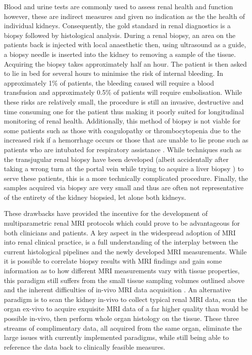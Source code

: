 Blood and urine tests are commonly used to assess renal health and function however, these are indirect measures and given no indication as the the health of individual kidneys. Consequently, the gold standard in renal diagnostics is a biopsy followed by histological analysis. During a renal biopsy, an area on the patients back is injected with local anaesthetic then, using ultrasound as a guide, a biopsy needle is inserted into the kidney to removing a sample of the tissue. Acquiring the biopsy takes approximately half an hour. The patient is then asked to lie in bed for several hours to minimise the risk of internal bleeding. In approximately 1\% of patients, the bleeding caused will require a blood transfusion and approximately 0.5\% of patients will require embolisation. While these risks are relatively small, the procedure is still an invasive, destructive and time consuming one for the patient thus making it poorly suited for longitudinal monitoring of renal health. Additionally, this method of biopsy is not viable for some patients such as those with coagulopathy or thrombocytopenia due to the increased risk if a hemorrhage occurs or those that are unable to lie prone such as patients who are intubated for respiratory assistance \cite{rathod_safety_2017}. While techniques such as the transjugular renal biopsy have been developed (albeit accidentally after taking a wrong turn at the portal vein while trying to acquire a liver biopsy \cite{mal_transjugular_1990}) to serve these patients, this is a more technically complicated procedure. Finally, the samples acquired via biopsy are very small and thus are often not representative of the entirety of the kidney biopsied, let alone both kidneys.

These drawbacks have provided the incentive for the development of multiparametric renal \ac{MRI} protocols which could prove to be advantageous for both clinicians and patients. A key aspect in the widespread adoption of \ac{MRI} into renal clinical practice, is a full understanding of the interplay between the current histological pipelines and the newly developed \ac{MRI} measurements. While it is possible to correlate biopsy results with \ac{MRI} findings and gain some information as to how different \ac{MRI} measurements vary with tissue properties, this paradigm still suffers from the small tissue sampling volumes outlined above and the inherent difficulties of in-vivo \ac{MRI} data acquisition \cite{leung_could_2017}. An alternative paradigm is to scan the kidney in-vivo to collect typical renal \ac{MRI} data, scan the organ ex-vivo to acquire exquisite \ac{MRI} data of a far higher quality than would be possible in-vivo, then perform whole organ histology on the tissue. These three streams of complimentary data, all acquired from the same organ, eliminate the large issues with currently implemented paradigms, while still being able to reference the data back to clinically feasible measures.


